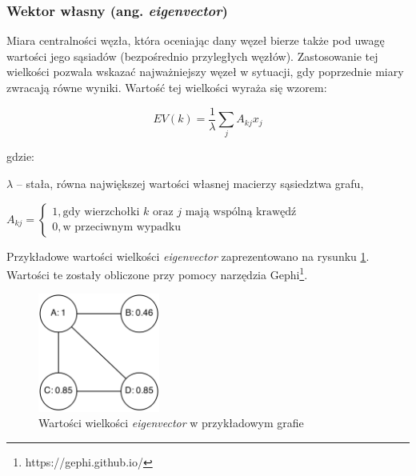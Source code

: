 \clearpage
\subsubsection{Wektor własny (ang. \textit{eigenvector})}
Miara centralności węzła,  która oceniając dany węzeł bierze także pod uwagę 
wartości jego sąsiadów (bezpośrednio przyległych węzłów).
Zastosowanie tej wielkości pozwala wskazać najważniejszy węzeł w sytuacji,
gdy poprzednie miary zwracają równe wyniki. Wartość tej wielkości wyraża się
wzorem:

\begin{equation}
EV(k) = \frac{1}{\lambda}\sum\limits_{j}A_{kj}x_j
\end{equation}

gdzie:

$\lambda$ -- stała, równa największej wartości własnej macierzy sąsiedztwa grafu,

\begin{math}
 A_{kj} =
  \begin{cases}
   1, \text{gdy wierzchołki $k$ oraz $j$ mają wspólną krawędź} \\
   0, \text{w przeciwnym wypadku}
  \end{cases}

\end{math}


\bigskip

Przykładowe wartości wielkości \textit{eigenvector}
zaprezentowano na rysunku \ref{image:eigenvector}. Wartości te zostały
obliczone przy pomocy narzędzia Gephi\footnote{https://gephi.github.io/}.

\begin{figure}[ht!]
\centering
\includegraphics[width=40mm]{img/eigenvector.png}
\caption{Wartości wielkości \textit{eigenvector} w przykładowym grafie}
\label{image:eigenvector}
\end{figure}


